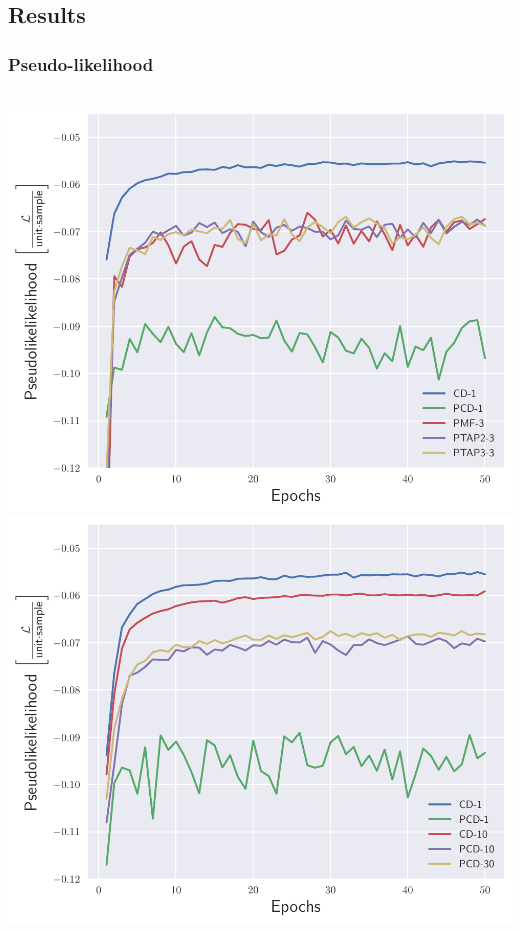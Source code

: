 \subsection{Results}
\begin{frame}
  \frametitle{Pseudo-likelihood}
  \begin{columns}
      \includegraphics[width=\textwidth]{img/numerical-experiments/psl-plot-global.pdf}
      \includegraphics[width=\linewidth]{img/numerical-experiments/psl-plot-classical.pdf}
  \end{columns}
\end{frame}


